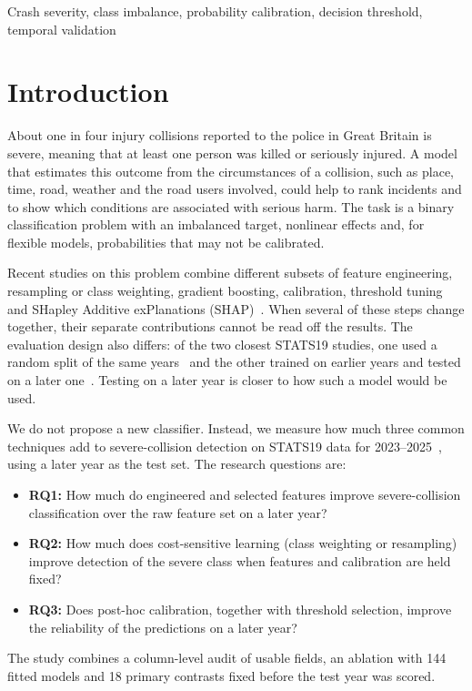 \documentclass[conference,letterpaper]{IEEEtran}
\begin{document}
\begin{IEEEkeywords}
Crash severity, class imbalance, probability calibration, decision threshold, temporal validation
\end{IEEEkeywords}

\section{Introduction}

About one in four injury collisions reported to the police in Great Britain is severe, meaning that at least one person was killed or seriously injured. A model that estimates this outcome from the circumstances of a collision, such as place, time, road, weather and the road users involved, could help to rank incidents and to show which conditions are associated with serious harm. The task is a binary classification problem with an imbalanced target, nonlinear effects and, for flexible models, probabilities that may not be calibrated.

Recent studies on this problem combine different subsets of feature engineering, resampling or class weighting, gradient boosting, calibration, threshold tuning and SHapley Additive exPlanations (SHAP)~\cite{le2026ksi,alhawarat2026calibrated,gao2026ensemble}. When several of these steps change together, their separate contributions cannot be read off the results. The evaluation design also differs: of the two closest STATS19 studies, one used a random split of the same years~\cite{le2026ksi} and the other trained on earlier years and tested on a later one~\cite{alhawarat2026calibrated}. Testing on a later year is closer to how such a model would be used.

We do not propose a new classifier. Instead, we measure how much three common techniques add to severe-collision detection on STATS19 data for 2023--2025~\cite{dft2026stats19}, using a later year as the test set. The research questions are:
\begin{itemize}
\item \textbf{RQ1:} How much do engineered and selected features improve severe-collision classification over the raw feature set on a later year?
\item \textbf{RQ2:} How much does cost-sensitive learning (class weighting or resampling) improve detection of the severe class when features and calibration are held fixed?
\item \textbf{RQ3:} Does post-hoc calibration, together with threshold selection, improve the reliability of the predictions on a later year?
\end{itemize}
The study combines a column-level audit of usable fields, an ablation with 144 fitted models and 18 primary contrasts fixed before the test year was scored.
\end{document}
